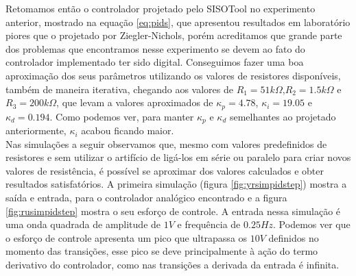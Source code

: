 \documentclass{article}
\begin{document}
Retomamos então o controlador projetado pelo SISOTool no experimento anterior, mostrado na equação \ref{eq:pids}, que apresentou resultados em laboratório piores que o projetado por Ziegler-Nichols, porém acreditamos que grande parte dos problemas que encontramos nesse experimento se devem ao fato do controlador implementado ter sido digital. Conseguimos fazer uma boa aproximação dos seus parâmetros utilizando os valores de resistores disponíveis, também de maneira iterativa, chegando aos valores de $R_1=51k\Omega$,$R_2=1.5k\Omega$ e $R_3=200k\Omega$, que levam a valores aproximados de $\kappa_p=4.78$, $\kappa_i=19.05$ e $\kappa_d=0.194$. Como podemos ver, para manter $\kappa_p$ e $\kappa_d$ semelhantes ao projetado anteriormente, $\kappa_i$ acabou ficando maior.\\

Nas simulações a seguir observamos que, mesmo com valores predefinidos de resistores e sem utilizar o artifício de ligá-los em série ou paralelo para criar novos valores de resistência, é possível se aproximar dos valores calculados e obter resultados satisfatórios.
A primeira simulação (figura \ref{fig:yrsimpidstep}) mostra a saída e entrada, para o controlador analógico encontrado e a figura \ref{fig:rusimpidstep} mostra o seu esforço de controle. A entrada nessa simulação é uma onda quadrada de amplitude de $1V$ e frequência de $0.25Hz$. Podemos ver que o esforço de controle apresenta um pico que ultrapassa os $10V$ definidos no momento das transições, esse pico se deve principalmente à ação do termo derivativo do controlador, como nas transições a derivada da entrada é infinita.
\end{document}
